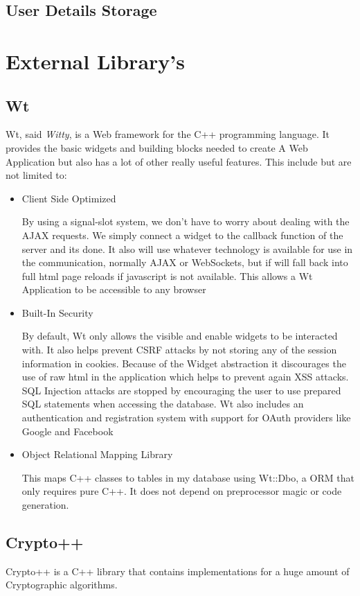 \subsection{User Details Storage}

\section{External Library's}
\subsection{Wt}

Wt, said \textit{Witty}, is a Web framework for the C++ programming language. It provides the basic widgets and building blocks needed to create A Web Application but also has a lot of other really useful features. This include but are not limited to:

\begin{itemize}
\item{Client Side Optimized

By using a signal-slot system, we don't have to worry about dealing with the AJAX requests. We simply connect a widget to the callback function of the server and its done. It also will use whatever technology is available for use in the communication, normally AJAX or WebSockets, but if will fall back into full html page reloads if javascript is not available. This allows a Wt Application to be accessible to any browser}
\item{Built-In Security

By default, Wt only allows the visible and enable widgets to be interacted with. It also helps prevent CSRF attacks by not storing any of the session information in cookies. Because of the Widget abstraction it discourages the use of raw html in the application which helps to prevent again XSS attacks. SQL Injection attacks are stopped by encouraging the user to use prepared SQL statements when accessing the database. Wt also includes an authentication and registration system with support for OAuth providers like Google and Facebook}
\item{Object Relational Mapping Library

This maps C++ classes to tables in my database using Wt::Dbo, a ORM that only requires pure C++. It does not depend on preprocessor magic or code generation.}
\end{itemize}

\subsection{Crypto++}

Crypto++ is a C++ library that contains implementations for a huge amount of Cryptographic algorithms.

